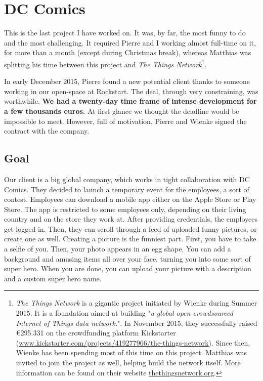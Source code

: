 \chapter{DC Comics}\label{tesco}

This is the last project I have worked on. It was, by far, the most funny to do and the most challenging. It required Pierre and I working almost full-time on it, for more than a month (except during Christmas break), whereas Matthias was splitting his time between this project and \textit{The Things Network}\footnote{\textit{The Things Network} is a gigantic project initiated by Wienke during Summer 2015. It is a foundation aimed at building "\textit{a global open crowdsourced Internet of Things data network.}". In November 2015, they successfully raised €295.331 on the crowdfunding platform Kickstarter (\href{https://www.kickstarter.com/projects/419277966/the-things-network}{www.kickstarter.com/projects/419277966/the-things-network}). Since then, Wienke has been spending most of this time on this project. Matthias was invited to join the project as well, helping build the network itself. More information can be found on their website \href{http://thethingsnetwork.org/}{thethingsnetwork.org}.}.

\medskip

In early December 2015, Pierre found a new potential client thanks to someone working in our open-space at Rockstart. The deal, through very constraining, was worthwhile. \textbf{We had a twenty-day time frame of intense development for a few thousands euros.} At first glance we thought the deadline would be impossible to meet. However, full of motivation, Pierre and Wienke signed the contract with the company.

\section{Goal}

Our client is a big global company, which works in tight collaboration with DC Comics. They decided to launch a temporary event for the employees, a sort of contest. Employees can download a mobile app either on the Apple Store or Play Store. The app is restricted to some employees only, depending on their living country and on the store they work at. After providing credentials, the employees get logged in. Then, they can scroll through a feed of uploaded funny pictures, or create one as well. Creating a picture is the funniest part. First, you have to take a selfie of you. Then, your photo appears in an egg shape. You can add a background and amusing items all over your face, turning you into some sort of super hero. When you are done, you can upload your picture with a description and a custom super hero name.

